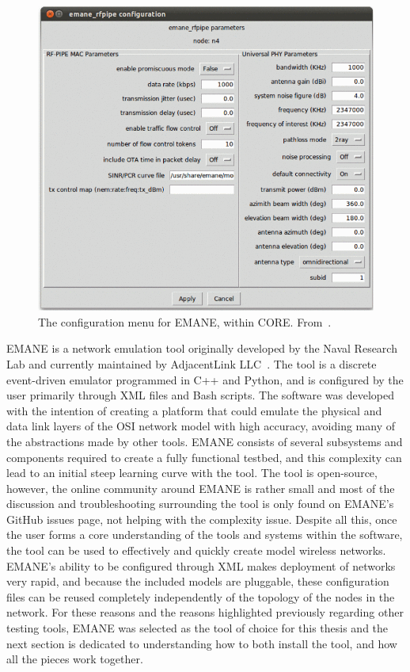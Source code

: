 \begin{figure}[!ht]
    \centering
    \includegraphics[width=\textwidth,keepaspectratio]{Images/Chpt2/core_emane.png}
    \caption{The configuration menu for EMANE, within CORE. From~\cite{emane_core}.}
    \label{core_emane}
\end{figure}

EMANE is a network emulation tool originally developed by the Naval Research Lab and currently maintained by AdjacentLink LLC~\cite{emane_nrl}.
The tool is a discrete event-driven emulator programmed in C++ and Python, and is configured by the user primarily through XML files and Bash scripts.
The software was developed with the intention of creating a platform that could emulate the physical and data link layers of the OSI network model with high accuracy, avoiding many of the abstractions made by other tools.
EMANE consists of several subsystems and components required to create a fully functional testbed, and this complexity can lead to an initial steep learning curve with the tool.
The tool is open-source, however, the online community around EMANE is rather small and most of the discussion and troubleshooting surrounding the tool is only found on EMANE's GitHub issues page, not helping with the complexity issue.
Despite all this, once the user forms a core understanding of the tools and systems within the software, the tool can be used to effectively and quickly create model wireless networks.
EMANE's ability to be configured through XML makes deployment of networks very rapid, and because the included models are pluggable, these configuration files can be reused completely independently of the topology of the nodes in the network.
For these reasons and the reasons highlighted previously regarding other testing tools, EMANE was selected as the tool of choice for this thesis and the next section is dedicated to understanding how to both install the tool, and how all the pieces work together.\par

